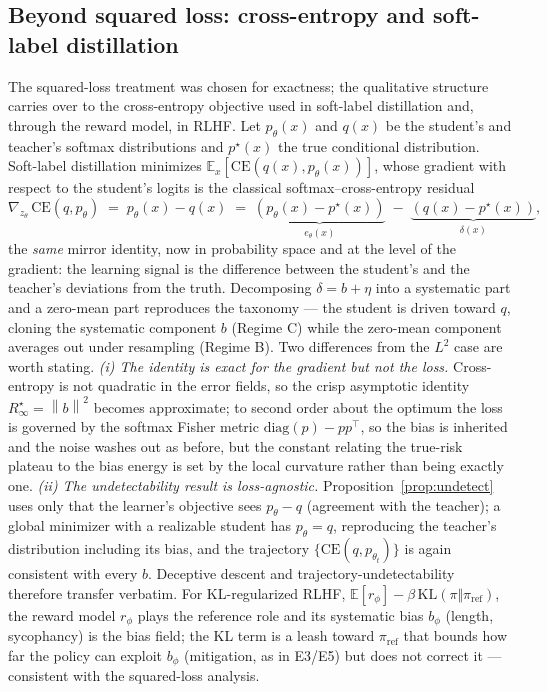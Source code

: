 \documentclass[10pt]{article} %
\theoremstyle{plain}
\theoremstyle{remark}
\newcommand{\E}{\mathbb{E}}
\newcommand{\norm}[1]{\left\lVert #1 \right\rVert}
\begin{document}
\subsection{Beyond squared loss: cross-entropy and soft-label distillation}
\label{app:ce}
\label{app:ce}
The squared-loss treatment was chosen for exactness; the qualitative structure carries over to the cross-entropy objective used in soft-label distillation and, through the reward model, in RLHF. Let $p_\theta(x)$ and $q(x)$ be the student's and teacher's softmax distributions and $p^\star(x)$ the true conditional distribution. Soft-label distillation minimizes $\E_x[\mathrm{CE}(q(x),p_\theta(x))]$, whose gradient with respect to the student's logits is the classical softmax--cross-entropy residual
\[
\nabla_{z_\theta}\,\mathrm{CE}(q,p_\theta) \;=\; p_\theta(x) - q(x) \;=\; \underbrace{(p_\theta(x)-p^\star(x))}_{e_\theta(x)} \;-\; \underbrace{(q(x)-p^\star(x))}_{\delta(x)} ,
\]
the \emph{same} mirror identity, now in probability space and at the level of the gradient: the learning signal is the difference between the student's and the teacher's deviations from the truth. Decomposing $\delta=b+\eta$ into a systematic part and a zero-mean part reproduces the taxonomy --- the student is driven toward $q$, cloning the systematic component $b$ (Regime C) while the zero-mean component averages out under resampling (Regime B). Two differences from the $L^2$ case are worth stating. \emph{(i) The identity is exact for the gradient but not the loss.} Cross-entropy is not quadratic in the error fields, so the crisp asymptotic identity $R^\star_\infty=\norm{b}^2$ becomes approximate; to second order about the optimum the loss is governed by the softmax Fisher metric $\mathrm{diag}(p)-pp^\top$, so the bias is inherited and the noise washes out as before, but the constant relating the true-risk plateau to the bias energy is set by the local curvature rather than being exactly one. \emph{(ii) The undetectability result is loss-agnostic.} Proposition~\ref{prop:undetect} uses only that the learner's objective sees $p_\theta-q$ (agreement with the teacher); a global minimizer with a realizable student has $p_\theta=q$, reproducing the teacher's distribution including its bias, and the trajectory $\{\mathrm{CE}(q,p_{\theta_t})\}$ is again consistent with every $b$. Deceptive descent and trajectory-undetectability therefore transfer verbatim. For KL-regularized RLHF, $\E[r_\phi]-\beta\,\mathrm{KL}(\pi\Vert\pi_{\mathrm{ref}})$, the reward model $r_\phi$ plays the reference role and its systematic bias $b_\phi$ (length, sycophancy) is the bias field; the KL term is a leash toward $\pi_{\mathrm{ref}}$ that bounds how far the policy can exploit $b_\phi$ (mitigation, as in E3/E5) but does not correct it --- consistent with the squared-loss analysis.
\end{document}
